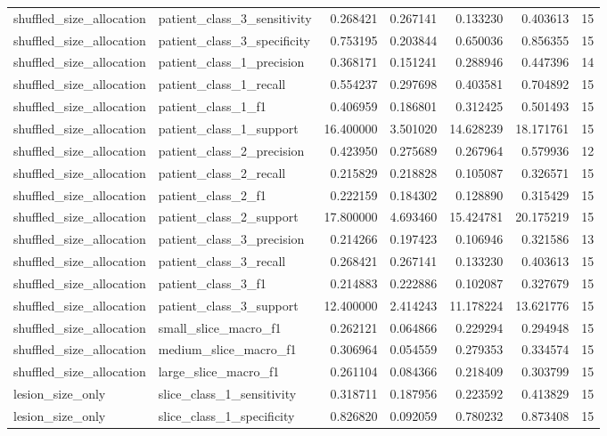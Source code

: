 \begin{tabular}{llrrrrr}
shuffled_size_allocation & patient_class_3_sensitivity & 0.268421 & 0.267141 & 0.133230 & 0.403613 & 15 \\
shuffled_size_allocation & patient_class_3_specificity & 0.753195 & 0.203844 & 0.650036 & 0.856355 & 15 \\
shuffled_size_allocation & patient_class_1_precision & 0.368171 & 0.151241 & 0.288946 & 0.447396 & 14 \\
shuffled_size_allocation & patient_class_1_recall & 0.554237 & 0.297698 & 0.403581 & 0.704892 & 15 \\
shuffled_size_allocation & patient_class_1_f1 & 0.406959 & 0.186801 & 0.312425 & 0.501493 & 15 \\
shuffled_size_allocation & patient_class_1_support & 16.400000 & 3.501020 & 14.628239 & 18.171761 & 15 \\
shuffled_size_allocation & patient_class_2_precision & 0.423950 & 0.275689 & 0.267964 & 0.579936 & 12 \\
shuffled_size_allocation & patient_class_2_recall & 0.215829 & 0.218828 & 0.105087 & 0.326571 & 15 \\
shuffled_size_allocation & patient_class_2_f1 & 0.222159 & 0.184302 & 0.128890 & 0.315429 & 15 \\
shuffled_size_allocation & patient_class_2_support & 17.800000 & 4.693460 & 15.424781 & 20.175219 & 15 \\
shuffled_size_allocation & patient_class_3_precision & 0.214266 & 0.197423 & 0.106946 & 0.321586 & 13 \\
shuffled_size_allocation & patient_class_3_recall & 0.268421 & 0.267141 & 0.133230 & 0.403613 & 15 \\
shuffled_size_allocation & patient_class_3_f1 & 0.214883 & 0.222886 & 0.102087 & 0.327679 & 15 \\
shuffled_size_allocation & patient_class_3_support & 12.400000 & 2.414243 & 11.178224 & 13.621776 & 15 \\
shuffled_size_allocation & small_slice_macro_f1 & 0.262121 & 0.064866 & 0.229294 & 0.294948 & 15 \\
shuffled_size_allocation & medium_slice_macro_f1 & 0.306964 & 0.054559 & 0.279353 & 0.334574 & 15 \\
shuffled_size_allocation & large_slice_macro_f1 & 0.261104 & 0.084366 & 0.218409 & 0.303799 & 15 \\
lesion_size_only & slice_class_1_sensitivity & 0.318711 & 0.187956 & 0.223592 & 0.413829 & 15 \\
lesion_size_only & slice_class_1_specificity & 0.826820 & 0.092059 & 0.780232 & 0.873408 & 15 \\

\end{tabular}
